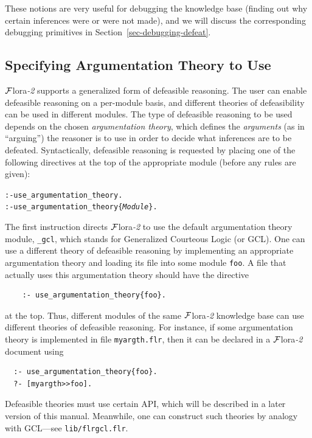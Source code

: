 \documentclass[11pt]{article}
\newcommand{\FLORA}{{\mbox{\sc ${\cal F}${lora}\rm\emph{-2}}}\xspace}
\begin{document}
These notions are very useful for debugging the knowledge base (finding out why
certain inferences were or were not made), and we will discuss the
corresponding debugging primitives in Section~\ref{sec-debugging-defeat}.


\subsection{Specifying Argumentation Theory to Use}

\FLORA supports a generalized form of defeasible reasoning.
The user can enable defeasible reasoning on a per-module basis, and
different theories of defeasibility can be used in different modules.
The type of defeasible reasoning to be used depends on the chosen
\emph{argumentation theory}, which defines the \emph{arguments} (as in
``arguing'') the reasoner is to use in order to decide what inferences
are to be defeated. Syntactically, defeasible reasoning is requested
by placing one of the following directives at the top of the
appropriate module (before any rules are given):

\begin{alltt}
  :- use_argumentation_theory.
  :- use_argumentation_theory\{\emph{Module}\}.
\end{alltt}
The first instruction directs \FLORA to use the default argumentation theory
module, {\tt \_gcl}, which stands for Generalized Courteous Logic (or GCL).
One can use a different theory of defeasible reasoning by implementing an
appropriate argumentation theory and
loading its file into some module {\tt foo}.
A file that actually uses this argumentation theory should have
the directive
\begin{verbatim}
    :- use_argumentation_theory{foo}.
\end{verbatim}
at the top. Thus, different modules of the same \FLORA
knowledge base can use different theories of defeasible reasoning.
For instance, if some argumentation theory is implemented in file
\texttt{myargth.flr}, then it can be declared in a \FLORA document
using
\begin{verbatim}
  :- use_argumentation_theory{foo}.
  ?- [myargth>>foo].
\end{verbatim}

Defeasible theories must use certain API, which will
be described in a later version of this manual. Meanwhile, one can
construct such theories by analogy with GCL---see {\tt lib/flrgcl.flr}.  
\end{document}
